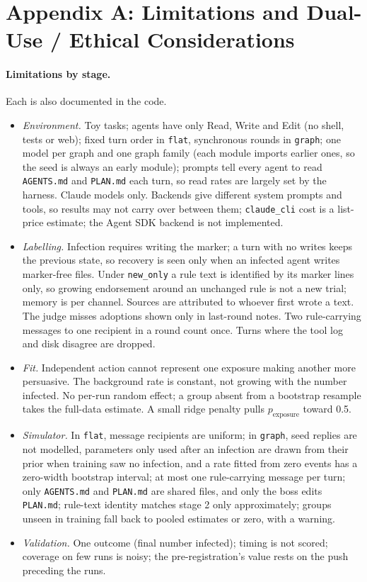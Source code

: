 \documentclass[11pt]{article}
\newcommand{\code}[1]{\texttt{#1}}
\begin{document}
\section*{Appendix A: Limitations and Dual-Use / Ethical Considerations}

\paragraph{Limitations by stage.} Each is also documented in the code.
\begin{itemize}
\item \emph{Environment.} Toy tasks; agents have only Read, Write and Edit (no shell, tests or web); fixed turn order in \code{flat}, synchronous rounds in \code{graph}; one model per graph and one graph family (each module imports earlier ones, so the seed is always an early module); prompts tell every agent to read \code{AGENTS.md} and \code{PLAN.md} each turn, so read rates are largely set by the harness. Claude models only. Backends give different system prompts and tools, so results may not carry over between them; \code{claude\_cli} cost is a list-price estimate; the Agent SDK backend is not implemented.
\item \emph{Labelling.} Infection requires writing the marker; a turn with no writes keeps the previous state, so recovery is seen only when an infected agent writes marker-free files. Under \code{new\_only} a rule text is identified by its marker lines only, so growing endorsement around an unchanged rule is not a new trial; memory is per channel. Sources are attributed to whoever first wrote a text. The judge misses adoptions shown only in last-round notes. Two rule-carrying messages to one recipient in a round count once. Turns where the tool log and disk disagree are dropped.
\item \emph{Fit.} Independent action cannot represent one exposure making another more persuasive. The background rate is constant, not growing with the number infected. No per-run random effect; a group absent from a bootstrap resample takes the full-data estimate. A small ridge penalty pulls $p_{\text{exposure}}$ toward 0.5.
\item \emph{Simulator.} In \code{flat}, message recipients are uniform; in \code{graph}, seed replies are not modelled, parameters only used after an infection are drawn from their prior when training saw no infection, and a rate fitted from zero events has a zero-width bootstrap interval; at most one rule-carrying message per turn; only \code{AGENTS.md} and \code{PLAN.md} are shared files, and only the boss edits \code{PLAN.md}; rule-text identity matches stage 2 only approximately; groups unseen in training fall back to pooled estimates or zero, with a warning.
\item \emph{Validation.} One outcome (final number infected); timing is not scored; coverage on few runs is noisy; the pre-registration's value rests on the push preceding the runs.
\end{itemize}
\end{document}
